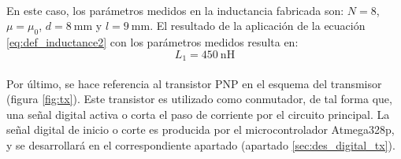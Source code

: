 \paragraph{}
En este caso, los par\'ametros medidos en la inductancia fabricada son: $N = 8$, $\mu = \mu_0$, $d = \SI{8}{\milli\metre}$ y $l = \SI{9}{\milli\metre}$. El resultado de la aplicaci\'on de la ecuaci\'on \ref{eq:def_inductance2} con los par\'ametros medidos resulta en: $$L_1 = \SI{450}{\nano\henry}$$


\paragraph{} 
Por último, se hace referencia al transistor PNP en el esquema del transmisor (figura \ref{fig:tx}). Este transistor es utilizado como conmutador, de tal forma que, una señal digital activa o corta el paso de corriente por el circuito principal. La señal digital de inicio o corte es producida por el microcontrolador Atmega328p, y se desarrollará en el correspondiente apartado (apartado \ref{sec:des_digital_tx}).

